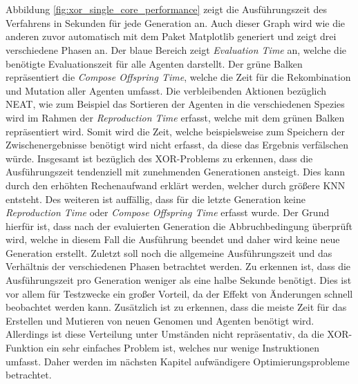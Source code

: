 \\\\
Abbildung \ref{fig:xor_single_core_performance} zeigt die Ausführungszeit des Verfahrens in Sekunden für jede Generation an. Auch dieser Graph wird wie die anderen zuvor automatisch mit dem Paket Matplotlib generiert und zeigt drei verschiedene Phasen an. Der blaue Bereich zeigt \emph{Evaluation Time } an, welche die benötigte Evaluationszeit für alle Agenten darstellt. Der grüne Balken repräsentiert die \emph{Compose Offspring Time}, welche die Zeit für die Rekombination und Mutation aller Agenten umfasst. Die verbleibenden Aktionen bezüglich \ac{NEAT}, wie zum Beispiel das Sortieren der Agenten in die verschiedenen Spezies wird im Rahmen der \emph{Reproduction Time} erfasst, welche mit dem grünen Balken repräsentiert wird. Somit wird die Zeit, welche beispielsweise zum Speichern der Zwischenergebnisse benötigt wird nicht erfasst, da diese das Ergebnis verfälschen würde. Insgesamt ist bezüglich des XOR-Problems zu erkennen, dass die Ausführungszeit tendenziell mit zunehmenden Generationen ansteigt. Dies kann durch den erhöhten Rechenaufwand erklärt werden, welcher durch größere \ac{KNN} entsteht. Des weiteren ist auffällig, dass für die letzte Generation keine \emph{Reproduction Time} oder \emph{Compose Offspring Time} erfasst wurde. Der Grund hierfür ist, dass nach der evaluierten Generation die Abbruchbedingung überprüft wird, welche in diesem Fall die Ausführung beendet und daher wird  keine neue Generation erstellt. Zuletzt soll noch die allgemeine Ausführungszeit und das Verhältnis der verschiedenen Phasen betrachtet werden. Zu erkennen ist, dass die Ausführungszeit pro Generation weniger als eine halbe Sekunde benötigt. Dies ist vor allem für Testzwecke ein großer Vorteil, da der Effekt von Änderungen schnell beobachtet werden kann. Zusätzlich ist zu erkennen, dass die meiste Zeit für das Erstellen und Mutieren von neuen Genomen und Agenten benötigt wird. Allerdings ist diese Verteilung unter Umständen nicht repräsentativ, da die XOR-Funktion ein sehr einfaches Problem ist, welches nur wenige Instruktionen umfasst. Daher werden im nächsten Kapitel aufwändigere Optimierungsprobleme betrachtet.
